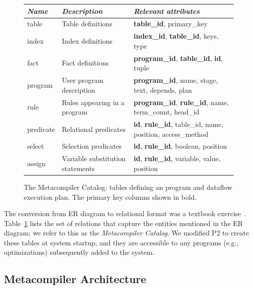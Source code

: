 \begin{figure}
\ssp
\begin{tabular}{|l|l|p{10cm}|} \hline
{\it Name}& {\it Description} & {\it Relevant attributes} \\ \hline\hline
table     & Table definitions & {\bf table\_id}, primary\_key\\ \hline
index     & Index definitions & {\bf index\_id}, {\bf table\_id}, keys, type \\ \hline
fact      & Fact definitions  & {\bf program\_id}, {\bf table\_id}, {\bf id}, tuple\\ \hline
program   & User program description     & {\bf program\_id}, name, stage, text, depends, plan \\ \hline
rule      & Rules appearing in a program   & {\bf program\_id}, {\bf rule\_id}, name,  term\_count, head\_id \\ \hline
predicate & Relational predicates  & {\bf id}, {\bf rule\_id}, table\_id, name, position, access\_method \\ \hline
select    & Selection predicates  & {\bf id}, {\bf rule\_id}, boolean, position \\  \hline
assign    & Variable substitution statements & {\bf id}, {\bf rule\_id}, variable, value, position \\ \hline 
\end{tabular}
\caption{The Metacompiler Catalog: tables defining an \OVERLOG program and dataflow execution plan.
         The primary key columns shown in bold. }
\label{tbl:catalog}
\end{figure}

The conversion from ER diagram to relational format was a textbook
exercise~\cite{DBTextbook}.  Table~\ref{tbl:catalog} lists the set of relations
that capture the entities mentioned in the ER diagram; we refer to this as the
{\em Metacompiler Catalog}.  We modified P2 to create these tables at system
startup, and they are accessible to any \OVERLOG programs (e.g., optimizations)
subsequently added to the system.

\subsection{Metacompiler Architecture}
\label{ch:evita:sec:metaarch}
  
